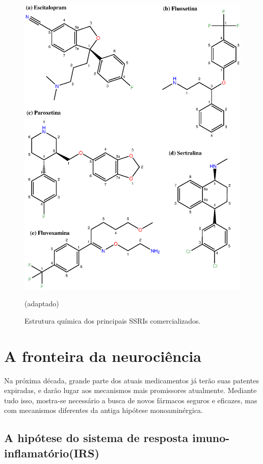 \begin{figure}[H]
\centering
\includegraphics[scale=0.60]{Figuras/isrs.eps}
\caption{Estrutura química dos principais SSRIs comercializados. \cite{Schatzberg2015}} (adaptado)
\end{figure} 

\section{A fronteira da neurociência}

Na próxima década, grande parte dos atuais medicamentos já terão suas patentes expiradas, e darão lugar aos mecanismos mais promissores atualmente. Mediante tudo isso, mostra-se necessário a busca de novos fármacos seguros e eficazes, mas com mecanismos diferentes da antiga hipótese monoaminérgica.  \cite{Nestler2006}

\subsection{A hipótese do sistema de resposta imuno-inflamatório(IRS)}

